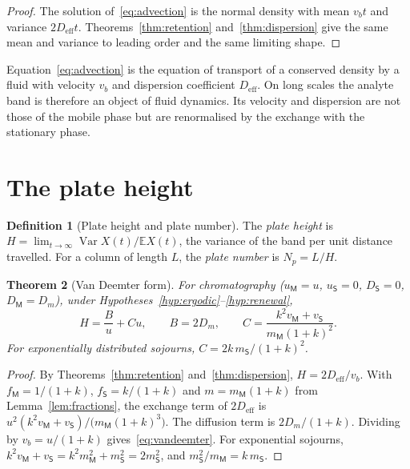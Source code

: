 \documentclass[11pt,a4paper]{article}
\newtheorem{theorem}{Theorem}[section]
\theoremstyle{definition}
\newtheorem{definition}[theorem]{Definition}
\theoremstyle{remark}
\newcommand{\E}{\mathbb{E}}
\newcommand{\Var}{\operatorname{Var}}
\newcommand{\Mob}{\mathsf{M}}
\newcommand{\Sta}{\mathsf{S}}
\begin{document}
\begin{proof}
The solution of~\eqref{eq:advection} is the normal density with mean $v_bt$ and variance $2D_{\mathrm{eff}}t$.
Theorems~\ref{thm:retention} and~\ref{thm:dispersion} give the same mean and variance to leading order and the same limiting shape.
\end{proof}

Equation~\eqref{eq:advection} is the equation of transport of a conserved density by a fluid with velocity $v_b$ and dispersion coefficient $D_{\mathrm{eff}}$.
On long scales the analyte band is therefore an object of fluid dynamics.
Its velocity and dispersion are not those of the mobile phase but are renormalised by the exchange with the stationary phase.

\section{The plate height}
\label{sec:plate}

\begin{definition}[Plate height and plate number]
\label{def:plate}
The \emph{plate height} is $H=\lim_{t\to\infty}\Var X(t)/\E X(t)$, the variance of the band per unit distance travelled.
For a column of length $L$, the \emph{plate number} is $N_p=L/H$.
\end{definition}

\begin{theorem}[Van Deemter form]
\label{thm:vandeemter}
For chromatography ($u_\Mob=u$, $u_\Sta=0$, $D_\Sta=0$, $D_\Mob=D_m$), under Hypotheses~\ref{hyp:ergodic}--\ref{hyp:renewal},
\begin{equation}
H=\frac Bu+Cu,\qquad B=2D_m,\qquad C=\frac{k^{2}v_\Mob+v_\Sta}{m_\Mob(1+k)^{2}}.
\label{eq:vandeemter}
\end{equation}
For exponentially distributed sojourns, $C=2k\,m_\Sta/(1+k)^{2}$.
\end{theorem}

\begin{proof}
By Theorems~\ref{thm:retention} and~\ref{thm:dispersion}, $H=2D_{\mathrm{eff}}/v_b$.
With $f_\Mob=1/(1+k)$, $f_\Sta=k/(1+k)$ and $m=m_\Mob(1+k)$ from Lemma~\ref{lem:fractions}, the exchange term of $2D_{\mathrm{eff}}$ is $u^{2}(k^{2}v_\Mob+v_\Sta)/\bigl(m_\Mob(1+k)^{3}\bigr)$.
The diffusion term is $2D_m/(1+k)$.
Dividing by $v_b=u/(1+k)$ gives~\eqref{eq:vandeemter}.
For exponential sojourns, $k^{2}v_\Mob+v_\Sta=k^{2}m_\Mob^{2}+m_\Sta^{2}=2m_\Sta^{2}$, and $m_\Sta^{2}/m_\Mob=k\,m_\Sta$.
\end{proof}
\end{document}
